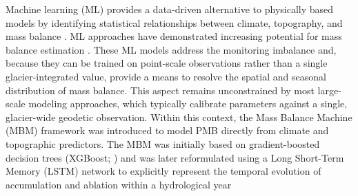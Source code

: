 \documentclass[draft]{agujournal2019}
\begin{document}
Machine learning (ML) provides a data-driven alternative to physically based models by identifying statistical relationships between climate, topography, and mass balance . ML approaches have demonstrated increasing potential for mass balance estimation \citep[e.g.,][]{Bolibar_2022, Anilkumar_2023, Guidicelli_2023, vanderMeer_2025, Maslov_2026}. These ML models address the monitoring imbalance and, because they can be trained on point-scale observations rather than a single glacier-integrated value, provide a means to resolve the spatial and seasonal distribution of mass balance. This aspect remains unconstrained by most large-scale modeling approaches, which typically calibrate parameters against a single, glacier-wide geodetic observation. Within this context, the Mass Balance Machine (MBM) framework was introduced to model PMB directly from climate and topographic predictors. The MBM was initially based on gradient-boosted decision trees (XGBoost; \citealp{Sjursen2025}) and was later reformulated using a Long Short-Term Memory (LSTM) network to explicitly represent the temporal evolution of accumulation and ablation within a hydrological year \citep{vanderMeer_2026}
\end{document}
